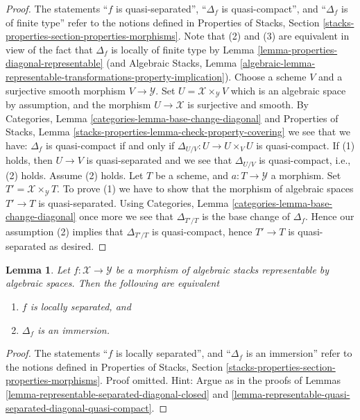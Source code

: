 \documentclass{stacks-project}
\theoremstyle{plain}
\newtheorem{lemma}[subsection]{Lemma}
\theoremstyle{definition}
\theoremstyle{remark}
\numberwithin{equation}{subsection}
\begin{document}
\begin{proof}
The statements
``$f$ is quasi-separated'',
``$\Delta_f$ is quasi-compact'', and
``$\Delta_f$ is of finite type''
refer to the notions defined in
Properties of Stacks,
Section \ref{stacks-properties-section-properties-morphisms}.
Note that (2) and (3) are equivalent in view of the fact that
$\Delta_f$ is locally of finite type by
Lemma \ref{lemma-properties-diagonal-representable}
(and
Algebraic Stacks, Lemma
\ref{algebraic-lemma-representable-transformations-property-implication}).
Choose a scheme $V$ and a surjective smooth morphism $V \to \mathcal{Y}$.
Set $U = \mathcal{X} \times_\mathcal{Y} V$ which is an algebraic
space by assumption, and the morphism $U \to \mathcal{X}$ is surjective
and smooth. By
Categories, Lemma \ref{categories-lemma-base-change-diagonal}
and
Properties of Stacks,
Lemma \ref{stacks-properties-lemma-check-property-covering}
we see that we have: $\Delta_f$ is quasi-compact if and only if
$\Delta_{U/V} : U \to  U \times_V U$ is quasi-compact.
If (1) holds, then $U \to V$ is quasi-separated and we see that
$\Delta_{U/V}$ is quasi-compact, i.e., (2) holds.
Assume (2) holds. Let $T$ be a scheme, and $a : T \to \mathcal{Y}$
a morphism. Set $T' = \mathcal{X} \times_\mathcal{Y} T$. To prove
(1) we have to show that the morphism of algebraic spaces $T' \to T$
is quasi-separated. Using
Categories, Lemma \ref{categories-lemma-base-change-diagonal}
once more we see that $\Delta_{T'/T}$ is the base change of
$\Delta_f$. Hence our assumption (2) implies that $\Delta_{T'/T}$
is quasi-compact, hence $T' \to T$ is quasi-separated as desired.
\end{proof}

\begin{lemma}
\label{lemma-representable-locally-separated-diagonal-immersion}
Let $f : \mathcal{X} \to \mathcal{Y}$ be a morphism of algebraic stacks
representable by algebraic spaces. Then the following are equivalent
\begin{enumerate}
\item $f$ is locally separated, and
\item $\Delta_f$ is an immersion.
\end{enumerate}
\end{lemma}

\begin{proof}
The statements ``$f$ is locally separated'', and ``$\Delta_f$ is an immersion''
refer to the notions defined in
Properties of Stacks,
Section \ref{stacks-properties-section-properties-morphisms}.
Proof omitted. Hint: Argue as in the proofs of
Lemmas \ref{lemma-representable-separated-diagonal-closed} and
\ref{lemma-representable-quasi-separated-diagonal-quasi-compact}.
\end{proof}
\end{document}

